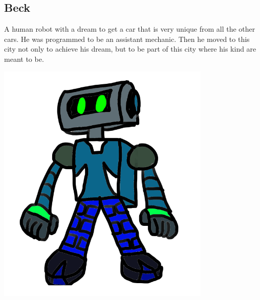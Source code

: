 \documentclass[12pt]{article}
\begin{document}
\begin{CJK}{UTF8}{min}
	\subsection*{Beck}
	A human robot with a dream to get a car that is very unique from all the other cars. He was programmed to be an assistant mechanic. Then he moved to this city not only to achieve his dream, but to be part of this city where his kind are meant to be.

	\begin{center}
		\includegraphics[width=4in]{Beck}
	\end{center}

\end{CJK}
\end{document}
